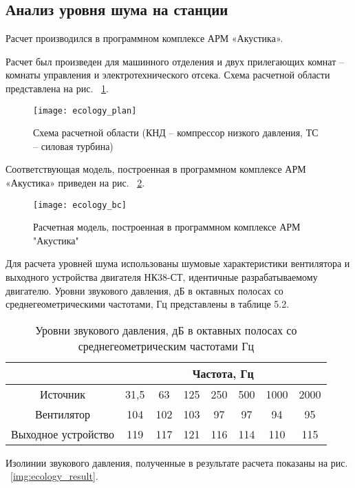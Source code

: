 \subsection{Анализ уровня шума на станции} %
\label{sub:ecology_noise_analisys}

Расчет производился в программном комплексе АРМ «Акустика».

Расчет был произведен для машинного отделения и двух прилегающих комнат – комнаты управления и электротехнического отсека.
Схема расчетной области представлена на рис. ~\ref{img:ecology_plan}.

\begin{figure}[H]
	\centering
	\texttt{[image: ecology\_plan]}
	\caption{Схема расчетной области (КНД – компрессор низкого давления, ТС – силовая турбина)}
	\label{img:ecology_plan}
\end{figure}

Соответствующая модель, построенная в программном комплексе АРМ «Акустика» приведен на рис. ~\ref{img:ecology_bc}.

\begin{figure}[H]
	\centering
	\texttt{[image: ecology\_bc]}
	\caption{Расчетная модель, построенная в программном комплексе АРМ "Акустика"}
	\label{img:ecology_bc}
\end{figure}

Для расчета уровней шума использованы шумовые характеристики вентилятора и выходного устройства двигателя НК38-СТ, идентичные разрабатываемому двигателю. Уровни звукового давления, дБ в октавных полосах со среднегеометрическими частотами, Гц  представлены в таблице 5.2.

\begin{samepage}
	\begin{longtable}{|c|c|c|c|c|c|c|c|}
		\caption{Уровни звукового давления, дБ в октавных полосах со среднегеометрическим частотами Гц} \label{tab:ecology_noise_power}
		\hline
		\multicolumn{1}{|c}{}& \multicolumn{7}{c|}{Частота, Гц} \\ \hline
		Источник & 31,5 & 63 & 125 & 250 & 500 & 1000 & 2000 \\ \hline
		Вентилятор & 104 & 102 & 103 & 97 & 97 & 94 & 95 \\ \hline
		Выходное устройство & 119 & 117 & 121 & 116 & 114 & 110 & 115 \\ \hline
		\end{longtable}
\end{samepage}

Изолинии звукового давления, полученные в результате расчета показаны на рис. ~\ref{img:ecology_result}.


